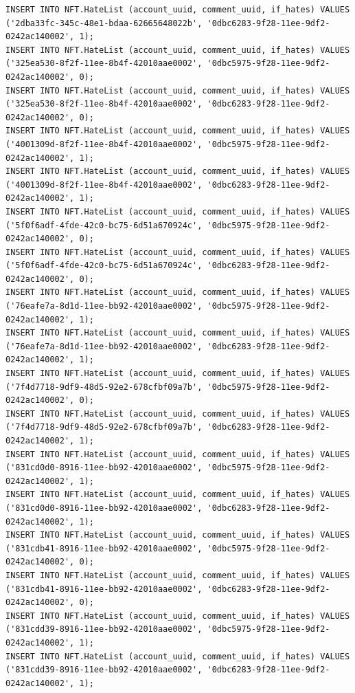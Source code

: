 \documentclass[a4paper, 12pt]{article}
\begin{document}
\begin{lstlisting}
INSERT INTO NFT.HateList (account_uuid, comment_uuid, if_hates) VALUES ('2dba33fc-345c-48e1-bdaa-62665648022b', '0dbc6283-9f28-11ee-9df2-0242ac140002', 1);
INSERT INTO NFT.HateList (account_uuid, comment_uuid, if_hates) VALUES ('325ea530-8f2f-11ee-8b4f-42010aae0002', '0dbc5975-9f28-11ee-9df2-0242ac140002', 0);
INSERT INTO NFT.HateList (account_uuid, comment_uuid, if_hates) VALUES ('325ea530-8f2f-11ee-8b4f-42010aae0002', '0dbc6283-9f28-11ee-9df2-0242ac140002', 0);
INSERT INTO NFT.HateList (account_uuid, comment_uuid, if_hates) VALUES ('4001309d-8f2f-11ee-8b4f-42010aae0002', '0dbc5975-9f28-11ee-9df2-0242ac140002', 1);
INSERT INTO NFT.HateList (account_uuid, comment_uuid, if_hates) VALUES ('4001309d-8f2f-11ee-8b4f-42010aae0002', '0dbc6283-9f28-11ee-9df2-0242ac140002', 1);
INSERT INTO NFT.HateList (account_uuid, comment_uuid, if_hates) VALUES ('5f0f6adf-4fde-42c0-bc75-6d51a670924c', '0dbc5975-9f28-11ee-9df2-0242ac140002', 0);
INSERT INTO NFT.HateList (account_uuid, comment_uuid, if_hates) VALUES ('5f0f6adf-4fde-42c0-bc75-6d51a670924c', '0dbc6283-9f28-11ee-9df2-0242ac140002', 0);
INSERT INTO NFT.HateList (account_uuid, comment_uuid, if_hates) VALUES ('76eafe7a-8d1d-11ee-bb92-42010aae0002', '0dbc5975-9f28-11ee-9df2-0242ac140002', 1);
INSERT INTO NFT.HateList (account_uuid, comment_uuid, if_hates) VALUES ('76eafe7a-8d1d-11ee-bb92-42010aae0002', '0dbc6283-9f28-11ee-9df2-0242ac140002', 1);
INSERT INTO NFT.HateList (account_uuid, comment_uuid, if_hates) VALUES ('7f4d7718-9df9-48d5-92e2-678cfbf09a7b', '0dbc5975-9f28-11ee-9df2-0242ac140002', 0);
INSERT INTO NFT.HateList (account_uuid, comment_uuid, if_hates) VALUES ('7f4d7718-9df9-48d5-92e2-678cfbf09a7b', '0dbc6283-9f28-11ee-9df2-0242ac140002', 1);
INSERT INTO NFT.HateList (account_uuid, comment_uuid, if_hates) VALUES ('831cd0d0-8916-11ee-bb92-42010aae0002', '0dbc5975-9f28-11ee-9df2-0242ac140002', 1);
INSERT INTO NFT.HateList (account_uuid, comment_uuid, if_hates) VALUES ('831cd0d0-8916-11ee-bb92-42010aae0002', '0dbc6283-9f28-11ee-9df2-0242ac140002', 1);
INSERT INTO NFT.HateList (account_uuid, comment_uuid, if_hates) VALUES ('831cdb41-8916-11ee-bb92-42010aae0002', '0dbc5975-9f28-11ee-9df2-0242ac140002', 0);
INSERT INTO NFT.HateList (account_uuid, comment_uuid, if_hates) VALUES ('831cdb41-8916-11ee-bb92-42010aae0002', '0dbc6283-9f28-11ee-9df2-0242ac140002', 0);
INSERT INTO NFT.HateList (account_uuid, comment_uuid, if_hates) VALUES ('831cdd39-8916-11ee-bb92-42010aae0002', '0dbc5975-9f28-11ee-9df2-0242ac140002', 1);
INSERT INTO NFT.HateList (account_uuid, comment_uuid, if_hates) VALUES ('831cdd39-8916-11ee-bb92-42010aae0002', '0dbc6283-9f28-11ee-9df2-0242ac140002', 1);

\end{lstlisting}
\end{document}
